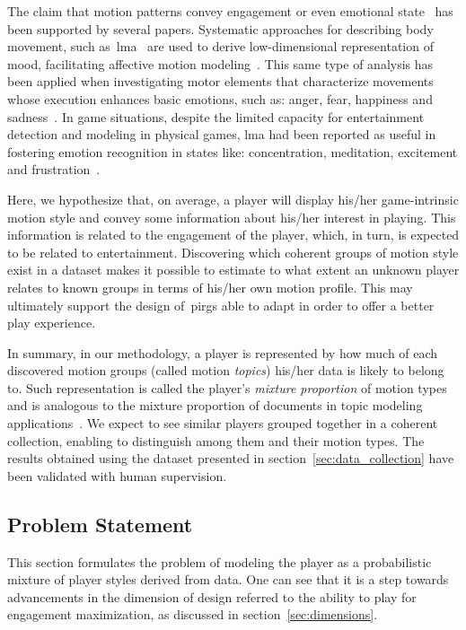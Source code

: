 The claim that motion patterns convey engagement or even emotional state~\citep{aristidou_emotion_2015,shafir_emotion_2016,tsachor_somatic_2017} has been supported by several papers. Systematic approaches for describing body movement, such as~\gls{lma}~\citep{laban_language_1974} are used to derive low-dimensional representation of mood, facilitating affective motion modeling~\citep{burton_laban_2016}. This same type of analysis has been applied when investigating motor elements that characterize movements whose execution enhances basic emotions, such as: anger, fear, happiness and sadness~\citep{shafir_emotion_2016}. In game situations, despite the limited capacity for entertainment detection and modeling in physical games, \gls{lma} had been reported as useful in fostering emotion recognition in states like: concentration, meditation, excitement and frustration~\citep{zacharatos_emotion_2013}.

Here, we hypothesize that, on average, a player will display his/her game-intrinsic motion style and convey some information about his/her interest in playing. This information is related to the engagement of the player, which, in turn, is expected to be related to entertainment. Discovering which coherent groups of motion style exist in a dataset makes it possible to estimate to what extent an unknown player relates to known groups in terms of his/her own motion profile. This may ultimately support the design of~\gls{pirg}s able to adapt in order to offer a better play experience.

In summary, in our methodology, a player is represented by how much of each discovered motion groups (called motion \textit{topics}) his/her data is likely to belong to. Such representation is called the player's \textit{mixture proportion} of motion types and is analogous to the mixture proportion of documents in topic modeling applications~\citep{blei_latent_2003}. We expect to see similar players grouped together in a coherent collection, enabling to distinguish among them and their motion types. The results obtained using the dataset presented in section~\ref{sec:data_collection} have been validated with human supervision.

\subsection{Problem Statement}
This section formulates the problem of modeling the player as a probabilistic mixture of player styles derived from data. One can see that it is a step towards advancements in the dimension of design referred to the ability to play for engagement maximization, as discussed in section~\ref{sec:dimensions}.


